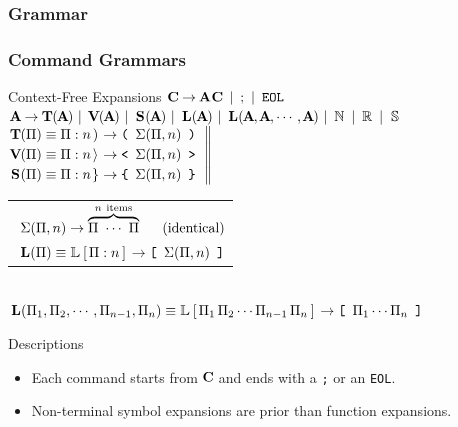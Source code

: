 \documentclass[9pt]{beamer}
\begin{document}
\subsubsection{Grammar}

\begin{frame}[t] \frametitle{Command Grammars}

	\begin{block}{Context-Free Expansions}
		$\left.\CMD \EXP \ARG \CMD \SEP \,\text{;}\, \SEP \,\texttt{EOL} \right.$ \\ [.24em]
		$\left.\ARG \EXP \TUP(\ARG) \SEP \VCT(\ARG) \SEP \SET(\ARG) \SEP
		 \LST(\ARG) \SEP \LST(\ARG, \ARG, \cdots, \ARG) \SEP \MSN \SEP \MSR \SEP \MSS \right.$ \\ [.27em]
		$\left.\text{%
		\begin{tabular}{@{}l}%
			$\TUP(\Pi) \EQV \Tup{\Pi}{n} \EXP \texttt{\TupBrkL}     \ \, \Sigma(\Pi, n) \ \, \texttt{\TupBrkR}$ \\ [.24em]
			$\VCT(\Pi) \EQV \Vct{\Pi}{n} \EXP \texttt{\VctBrkTextL} \ \, \Sigma(\Pi, n) \ \, \texttt{\VctBrkTextR}$ \\ [.24em]
			$\SET(\Pi) \EQV \Set{\Pi}{n} \EXP \texttt{\SetBrkL}     \ \, \Sigma(\Pi, n) \ \, \texttt{\SetBrkR}$
		\end{tabular}} \right\|\kern.128em$%
		\begin{tabular}{@{}l}%
			$\ \Sigma(\Pi, n) \rightarrow \overbrace{\Pi \ \cdots \ \Pi}^{n \ \text{items}} \quad\,\ \text{(identical)}$ \\ [.43em]
			$\ \LST(\Pi) \EQV \Lst{\Pi}{n} \EXP \texttt{\LstBrkL} \ \, \Sigma(\Pi, n) \ \, \texttt{\LstBrkR}$
		\end{tabular} \\ [.24em]
		$\left.\LST(\Pi_1,\Pi_2,\cdots,\Pi_{n-1},\Pi_n) \EQV \LstFull{\Pi_1\,\Pi_2\cdots\Pi_{n-1}\,\Pi_n} \EXP
		 \texttt{\LstBrkL} \ \, \Pi_1\cdots\Pi_n \ \, \texttt{\LstBrkR}\right.$
	\end{block}

	\begin{block}{Descriptions}
		\begin{itemize}
			\item Each command starts from $\CMD$ and ends with a \texttt{;} or an \texttt{EOL}.
			\item Non-terminal symbol expansions are prior than function expansions.
		\end{itemize}
	\end{block}

\end{frame}
\end{document}
